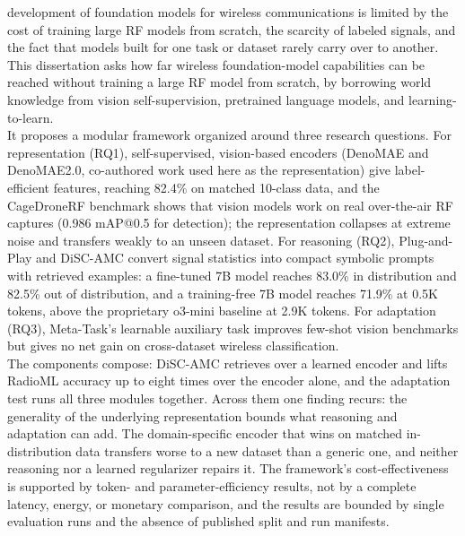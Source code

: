 %
%

\beforepreface
{}
{\noindent{} development of foundation models for wireless communications is limited by the cost of training large RF models from scratch, the scarcity of labeled signals, and the fact that models built for one task or dataset rarely carry over to another. This dissertation asks how far wireless foundation-model capabilities can be reached without training a large RF model from scratch, by borrowing world knowledge from vision self-supervision, pretrained language models, and learning-to-learn.\\
It proposes a modular framework organized around three research questions. For representation (RQ1), self-supervised, vision-based encoders (DenoMAE and DenoMAE2.0, co-authored work used here as the representation) give label-efficient features, reaching 82.4\% on matched 10-class data, and the CageDroneRF benchmark shows that vision models work on real over-the-air RF captures (0.986 mAP@0.5 for detection); the representation collapses at extreme noise and transfers weakly to an unseen dataset. For reasoning (RQ2), Plug-and-Play and DiSC-AMC convert signal statistics into compact symbolic prompts with retrieved examples: a fine-tuned 7B model reaches 83.0\% in distribution and 82.5\% out of distribution, and a training-free 7B model reaches 71.9\% at 0.5K tokens, above the proprietary o3-mini baseline at 2.9K tokens. For adaptation (RQ3), Meta-Task's learnable auxiliary task improves few-shot vision benchmarks but gives no net gain on cross-dataset wireless classification.\\
The components compose: DiSC-AMC retrieves over a learned encoder and lifts RadioML accuracy up to eight times over the encoder alone, and the adaptation test runs all three modules together. Across them one finding recurs: the generality of the underlying representation bounds what reasoning and adaptation can add. The domain-specific encoder that wins on matched in-distribution data transfers worse to a new dataset than a generic one, and neither reasoning nor a learned regularizer repairs it. The framework's cost-effectiveness is supported by token- and parameter-efficiency results, not by a complete latency, energy, or monetary comparison, and the results are bounded by single evaluation runs and the absence of published split and run manifests.}

